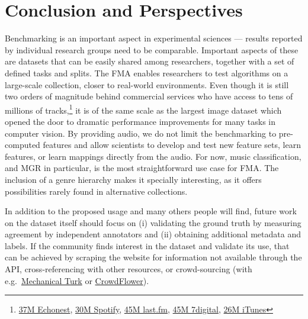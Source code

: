 \documentclass{article}
\begin{document}
\section{Conclusion and Perspectives}


Benchmarking is an important aspect in experimental sciences --- results reported by individual research groups need to be comparable. Important aspects of these are datasets that can be easily shared among researchers, together with a set of defined tasks and splits. The FMA enables researchers to test algorithms on a large-scale collection, closer to real-world environments. Even though it is still two orders of magnitude behind commercial services who have access to tens of millions of tracks,\footnote{\href{http://the.echonest.com}{37M Echonest}, \href{https://en.wikipedia.org/wiki/Spotify}{30M Spotify}, \href{http://www.skilledtests.com/wiki/Last.fm_statistics}{45M last.fm}, \href{http://bupz.com/best-websites-to-buy-musics}{45M 7digital}, \href{https://www.apple.com/pr/library/2013/02/06iTunes-Store-Sets-New-Record-with-25-Billion-Songs-Sold.html}{26M iTunes}} it is of the same scale as the largest image dataset which opened the door to dramatic performance improvements for many tasks in computer vision.
By providing audio, we do not limit the benchmarking to pre-computed features and allow scientists to develop and test new feature sets, learn features, or learn mappings directly from the audio.
For now, music classification, and MGR in particular, is the most straightforward use case for FMA. The inclusion of a genre hierarchy makes it specially interesting, as it offers possibilities rarely found in alternative collections.


In addition to the proposed usage and many others people will find, future work on the dataset itself should focus on (i) validating the ground truth by measuring agreement by independent annotators and (ii) obtaining additional metadata and labels.
If the community finds interest in the dataset and validate its use, that can be achieved by scraping the website for information not available through the API,
cross-referencing with other resources, or crowd-sourcing (with e.g.\ \href{https://www.mturk.com}{Mechanical Turk} or \href{https://www.crowdflower.com/}{CrowdFlower}).
\end{document}
